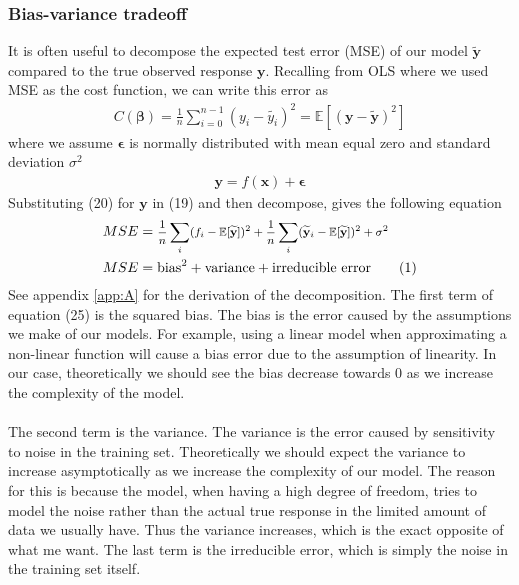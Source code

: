 \documentclass[a4paper,twocolumn]{article}
\newcommand\numberthis{\addtocounter{equation}{1}\tag{\theequation}}
\newcommand{\E}{\mathbb{E}}
\newcommand{\y}{\mathbf{y}}
\newcommand{\ytilde}{\mathbf{\widetilde{y}}}
\newcommand{\B}{\boldsymbol{\beta}}
\begin{document}
\subsubsection{Bias-variance tradeoff}
It is often useful to decompose the expected test error (MSE) of our model $\ytilde$ compared to the true observed response $\y$. Recalling from OLS where we used MSE as the cost function, we can write this error as
\begin{align}
    C(\B) = \frac{1}{n}\sum_{i=0}^{n-1}(y_{i} - \widetilde{y_{i}})^{2} = \E[(\y - \ytilde)^{2}]
\end{align}
where we assume $\mathbf{\epsilon}$ is normally distributed with mean equal zero and standard deviation $\sigma^{2}$
\begin{align}
    \y = f(\mathbf{x}) + \mathbf{\epsilon}
\end{align}
Substituting (20) for $\y$ in (19) and then decompose, gives the following equation
\begin{align*}
    \tiny
    MSE &= \text{\footnotesize$\frac{1}{n}\sum_{i}(f_{i} - \E[\ytilde])^{2} + \frac{1}{n}\sum_{i}(\ytilde_{i} - \E[\ytilde])^{2} + \sigma^{2}$}\\
    MSE &= \textrm{bias}^{2} + \textrm{variance} + \textrm{irreducible error} \numberthis\label{eqn}
\end{align*}
See appendix \autoref{app:A} for the derivation of the decomposition. The first term of equation (25) is the squared bias. The bias is the error caused by the assumptions we make of our models. For example, using a linear model when approximating a non-linear function will cause a bias error due to the assumption of linearity. In our case, theoretically we should see the bias decrease towards 0 as we increase the complexity of the model.\\
\\
The second term is the variance. The variance is the error caused by sensitivity to noise in the training set. Theoretically we should expect the variance to increase asymptotically as we increase the complexity of our model. The reason for this is because the model, when having a high degree of freedom, tries to model the noise rather than the actual true response in the limited amount of data we usually have. Thus the variance increases, which is the exact opposite of what me want. The last term is the irreducible error, which is simply the noise in the training set itself. \\
\\
\end{document}
